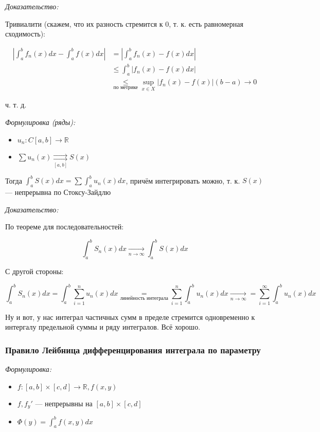\documentclass{article}
\def\rsh#1{\underset{#1}{\rightrightarrows}}
\begin{document}
\textit{Доказательство:}

Тривиалити (скажем, что их разность стремится к 0, т. к. есть равномерная сходимость): 

\begin{align*}
    \left|\int_a^b{f_n(x)dx} - \int_a^b{f(x)dx}\right|
 &=  \left|\int_a^b{f_n(x) - f(x)dx}\right| \\
  &\le \int_a^b \left|f_n(x) - f(x) dx\right| \\ 
  &\underset{\text{по метрике}}{\le} {\sup_{x \in X} \left|f_n(x) - f(x)\right|}(b - a) \rightarrow 0
\end{align*}

ч. т. д.

\textit{Формулировка (ряды):}

\begin{itemize}
    \item $u_n: C[a, b] \rightarrow \mathbb{R}$
    \item $\sum u_n(x) \rsh{[a, b]} S(x)$
\end{itemize}

Тогда $\int_a^bS(x)dx =\sum \int_a^b u_n(x) dx$, причём интегрировать можно, т. к. $S(x)$ --- непрерывна по Стоксу-Зайдлю

\textit{Доказательство:}

По теореме для последовательностей: 

\[\int_a^b S_n(x) dx \underset{n \rightarrow \infty}{\longrightarrow} \int_a^b S(x) dx\]

С другой стороны:

\[\int_a^b S_n(x) dx = \int_a^b \sum_{i = 1}^n u_n(x) dx \underset{\text{линейность интеграла}}{=} \sum_{i = 1}^n \int_a^b u_n(x) dx \underset{n \rightarrow \infty}{\longrightarrow} = \sum_{i = 1}^{\infty} \int_a^b u_n(x) dx\]

Ну и вот, у нас интеграл частичных сумм в пределе стремится одновременно к интергалу предельной суммы и ряду интегралов. Всё хорошо.

\subsubsection{Правило Лейбница дифференцирования интеграла по параметру}
\textit{Формулировка:}

\begin{itemize}
    \item $f: [a, b] \times [c, d] \rightarrow \mathbb{R}, f(x, y)$
    \item $f, f_y'$ --- непрерывны на $[a, b] \times [c, d]$
    \item $\Phi(y) = \int_a^b f(x, y) dx$
\end{itemize}
\end{document}
